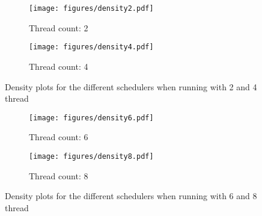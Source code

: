 \begin{figure}
	\centering
	\begin{subfigure}[t]{0.9\textwidth}
		\texttt{[image: figures/density2.pdf]}
		\caption{Thread count: 2}
	\end{subfigure}

	\begin{subfigure}[t]{0.9\textwidth}
		\texttt{[image: figures/density4.pdf]}
		\caption{Thread count: 4}
	\end{subfigure}
	
	\caption{Density plots for the different schedulers when running with 2 and 4 thread}
	\label{density1}
\end{figure}

\begin{figure}
	\centering
	\begin{subfigure}[t]{0.9\textwidth}
		\texttt{[image: figures/density6.pdf]}
		\caption{Thread count: 6}
		\label{dens6}
	\end{subfigure}

	\begin{subfigure}[t]{0.9\textwidth}
		\texttt{[image: figures/density8.pdf]}
		\caption{Thread count: 8}
		\label{dens8}
	\end{subfigure}
	\caption{Density plots for the different schedulers when running with 6 and 8 thread}
	\label{density2}
\end{figure}